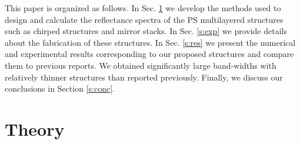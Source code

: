 \documentclass[a4paper,fleqn]{cas-sc}
\begin{document}
	This paper is organized as follows. In Sec. \ref{s:theory} we develop the
	methods used to design and calculate the reflectance spectra of the PS
	multilayered structures such as chirped structures and mirror
	stacks. In Sec. \ref{s:exp} we provide details about the
	fabrication of these structures. In Sec. \ref{s:res} we present the numerical
	and experimental results corresponding to our proposed structures and compare
	them to previous reports. We obtained significantly large band-widths
	with relatively thinner structures than reported previously.
	Finally, we discuss our conclusions in Section \ref{s:conc}.
	
	\section{Theory} \label{s:theory}
	
\end{document}
